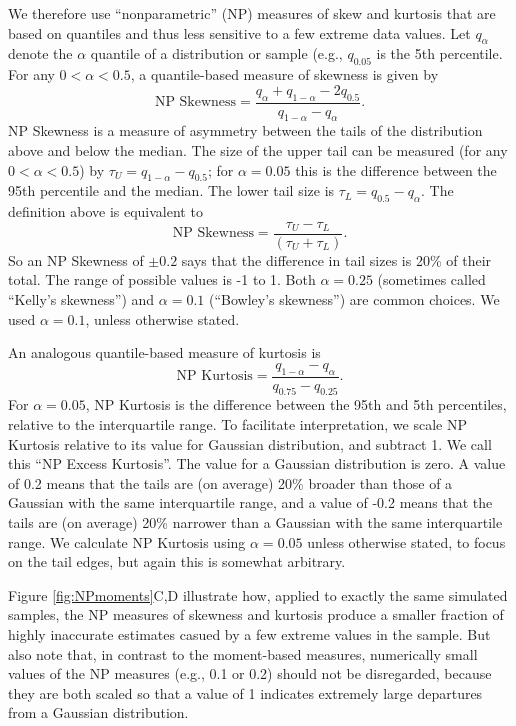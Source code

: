\documentclass[12pt]{article}
\newcounter{box}
\newcommand{\be}{\begin{equation}}
\newcommand{\ee}{\end{equation}}
\begin{document}
We therefore use ``nonparametric'' (NP) measures of skew and kurtosis that are based on quantiles and thus  
less sensitive to a few extreme data values. Let $q_\alpha$ denote the $\alpha$ quantile of a distribution or sample (e.g., $q_{0.05}$ 
is the 5th percentile. For any $0 < \alpha < 0.5$, a quantile-based measure of skewness is given by \citep{mcgillivray-1986}
\be
\mbox{NP Skewness} = \frac{q_\alpha + q_{1-\alpha} - 2 q_{0.5}}{q_{1-\alpha} - q_\alpha}.
\ee
NP Skewness is a measure of asymmetry between the tails of the distribution above and below the median. The size of the upper
tail can be measured (for any $0 < \alpha < 0.5$) by $\tau_U = q_{1-\alpha} - q_{0.5}$; for $\alpha=0.05$ this is the difference
between the 95th percentile and the median. The lower tail size is $\tau_L = q_{0.5} - q_\alpha$. The definition above
is equivalent to  
\be
\mbox{NP Skewness} = \frac{\tau_U - \tau_L}{(\tau_U + \tau_L)}.
\label{eqn:NPskew}
\ee
So an NP Skewness of $\pm 0.2$ says that the difference in tail sizes is 20\% of their total. The range of possible values 
is -1 to 1. Both $\alpha=0.25$ (sometimes called ``Kelly's skewness'') and $\alpha=0.1$ (``Bowley's skewness'') 
are common choices. We used $\alpha=0.1$, unless otherwise stated.  
 
An analogous quantile-based measure of kurtosis \citep{jones-etal-1994} is 
\be
\mbox{NP Kurtosis}  = \frac{q_{1-\alpha} - q_{\alpha}}{q_{0.75} - q_{0.25}}.
\label{eqn:NPkurt}
\ee
For $\alpha=0.05$, NP Kurtosis is the difference between the 95th and 5th percentiles, relative to the interquartile range. 
To facilitate interpretation, we scale NP Kurtosis relative to its value for Gaussian distribution, and subtract 1. 
We call this ``NP Excess Kurtosis''. The value for a Gaussian distribution is zero. A value of 0.2 means that the tails
are (on average) 20\% broader than those of a Gaussian with the same interquartile range, and a value of -0.2 means that the tails
are (on average) 20\% narrower than a Gaussian with the same interquartile range. We calculate NP Kurtosis using $\alpha=0.05$ 
unless otherwise stated, to focus on the tail edges, but again this is somewhat arbitrary. 

Figure \ref{fig:NPmoments}C,D illustrate how, applied to exactly the same simulated samples, the NP measures of skewness and
kurtosis produce a smaller fraction of highly inaccurate estimates casued by a few extreme values in the sample. But also note
that, in contrast to the moment-based measures, numerically small values of the NP measures (e.g., 0.1 or 0.2) should not be
disregarded, because they are both scaled so that a value of 1 indicates extremely large departures from a Gaussian distribution. 
\end{document}
